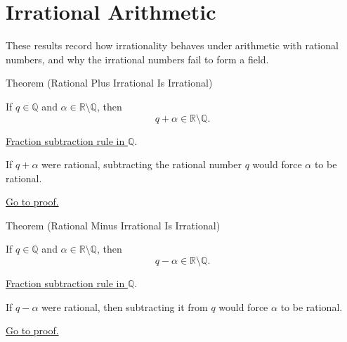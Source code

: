 
\section{Irrational Arithmetic}
\label{sec:irrational-arithmetic}

\begin{exposition}
These results record how irrationality behaves under arithmetic with rational
numbers, and why the irrational numbers fail to form a field.
\end{exposition}

\begin{theorembox}{Theorem (Rational Plus Irrational Is Irrational)}
\begin{theorem}
\label{thm:rational-plus-irrational-is-irrational}
If $q\in\mathbb{Q}$ and $\alpha\in\mathbb{R}\setminus\mathbb{Q}$, then
\[
q+\alpha\in\mathbb{R}\setminus\mathbb{Q}.
\]
\end{theorem}
\end{theorembox}
\begin{dependencies}
\hyperref[thm:rational-fraction-subtraction]{Fraction subtraction rule in $\mathbb{Q}$}.
\end{dependencies}
\begin{remark*}
If $q+\alpha$ were rational, subtracting the rational number $q$ would force
$\alpha$ to be rational.
\end{remark*}
\begin{remark*}[Proof]
\hyperref[prf:rational-plus-irrational-is-irrational]{Go to proof.}
\end{remark*}

\begin{theorembox}{Theorem (Rational Minus Irrational Is Irrational)}
\begin{theorem}
\label{thm:rational-minus-irrational-is-irrational}
If $q\in\mathbb{Q}$ and $\alpha\in\mathbb{R}\setminus\mathbb{Q}$, then
\[
q-\alpha\in\mathbb{R}\setminus\mathbb{Q}.
\]
\end{theorem}
\end{theorembox}
\begin{dependencies}
\hyperref[thm:rational-fraction-subtraction]{Fraction subtraction rule in $\mathbb{Q}$}.
\end{dependencies}
\begin{remark*}
If $q-\alpha$ were rational, then subtracting it from $q$ would force
$\alpha$ to be rational.
\end{remark*}
\begin{remark*}[Proof]
\hyperref[prf:rational-minus-irrational-is-irrational]{Go to proof.}
\end{remark*}

